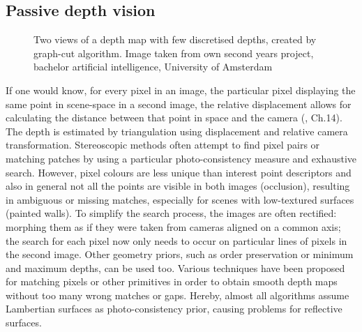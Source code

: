 \subsection{Passive depth vision}

\begin{figure}[htb!]
 \centering
 \caption{Two views of a depth map with few discretised depths, created by graph-cut algorithm. Image taken from own second years project, bachelor artificial intelligence, University of Amsterdam}
 \label{fig:depthmap_layer}
\end{figure}

If one would know, for every pixel in an image, the particular pixel displaying the same point in scene-space in a second image, the relative displacement allows for calculating the distance between that point in space and the camera (\cite{Prince2012}, Ch.14). The depth is estimated by triangulation using displacement and relative camera transformation. Stereoscopic methods often attempt to find pixel pairs or matching patches by using a particular photo-consistency measure and exhaustive search. However, pixel colours are less unique than interest point descriptors and also in general not all the points are visible in both images (occlusion), resulting in ambiguous or missing matches, especially for scenes with low-textured surfaces (\eg painted walls). To simplify the search process, the images are often rectified: morphing them as if they were taken from cameras aligned on a common axis; the search for each pixel now only needs to occur on particular lines of pixels in the second image. Other geometry priors, such as order preservation or minimum and maximum depths, can be used too. Various techniques have been proposed for matching pixels or other primitives in order to obtain smooth depth maps without too many wrong matches or gaps. Hereby, almost all algorithms assume Lambertian surfaces as photo-consistency prior, causing problems for reflective surfaces.

